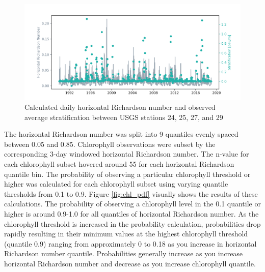 \documentclass[preprint,review,12pt]{elsarticle}
\begin{document}
\begin{figure}[ht!]
\centering
\includegraphics[width=\textwidth]{Figures/Rix_dsdz_timeseries.png}
\caption{Calculated daily horizontal Richardson number and observed average stratification between USGS stations 24, 25, 27, and 29}
\label{fig:rix}
\end{figure}
\FloatBarrier

The horizontal Richardson number was split into 9 quantiles evenly spaced between 0.05 and 0.85. Chlorophyll observations were subset by the corresponding 3-day windowed horizontal Richardson number. The n-value for each chlorophyll subset hovered around 55 for each horizontal Richardson quantile bin. The probability of observing a particular chlorophyll threshold or higher was calculated for each chlorophyll subset using varying quantile thresholds from 0.1 to 0.9. Figure \ref{fig:chl_pdf} visually shows the results of these calculations. The probability of observing a chlorophyll level in the 0.1 quantile or higher is around 0.9-1.0 for all quantiles of horizontal Richardson number. As the chlorophyll threshold is increased in the probability calculation, probabilities drop rapidly resulting in their minimum values at the highest chlorophyll threshold (quantile 0.9) ranging from approximately 0 to 0.18 as you increase in horizontal Richardson number quantile. Probabilities generally increase as you increase horizontal Richardson number and decrease as you increase chlorophyll quantile. 
\end{document}
